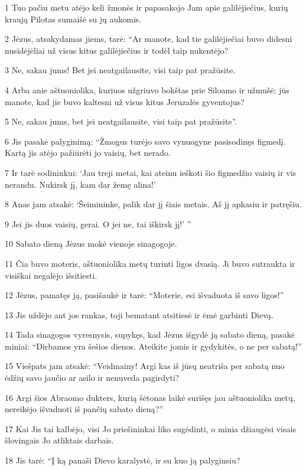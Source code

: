 \par 1 Tuo pačiu metu atėjo keli žmonės ir papasakojo Jam apie galilėjiečius, kurių kraują Pilotas sumaišė su jų aukomis. 
\par 2 Jėzus, atsakydamas jiems, tarė: “Ar manote, kad tie galilėjiečiai buvo didesni nusidėjėliai už visus kitus galilėjiečius ir todėl taip nukentėjo? 
\par 3 Ne, sakau jums! Bet jei neatgailausite, visi taip pat pražūsite. 
\par 4 Arba anie aštuoniolika, kuriuos užgriuvo bokštas prie Siloamo ir užmušė; jūs manote, kad jie buvo kaltesni už visus kitus Jeruzalės gyventojus? 
\par 5 Ne, sakau jums, bet jei neatgailausite, visi taip pat pražūsite”. 
\par 6 Jis pasakė palyginimą: “Žmogus turėjo savo vynuogyne pasisodinęs figmedį. Kartą jis atėjo pažiūrėti jo vaisių, bet nerado. 
\par 7 Ir tarė sodininkui: ‘Jau treji metai, kai ateinu ieškoti šio figmedžio vaisių ir vis nerandu. Nukirsk jį, kam dar žemę alina!’ 
\par 8 Anas jam atsakė: ‘Šeimininke, palik dar jį šiais metais. Aš jį apkasiu ir patręšiu. 
\par 9 Jei jis duos vaisių, gerai. O jei ne, tai iškirsk jį!’ ” 
\par 10 Sabato dieną Jėzus mokė vienoje sinagogoje. 
\par 11 Čia buvo moteris, aštuoniolika metų turinti ligos dvasią. Ji buvo sutraukta ir visiškai negalėjo išsitiesti. 
\par 12 Jėzus, pamatęs ją, pasišaukė ir tarė: “Moterie, esi išvaduota iš savo ligos!” 
\par 13 Jis uždėjo ant jos rankas, toji bematant atsitiesė ir ėmė garbinti Dievą. 
\par 14 Tada sinagogos vyresnysis, supykęs, kad Jėzus išgydė ją sabato dieną, pasakė miniai: “Dirbamos yra šešios dienos. Ateikite jomis ir gydykitės, o ne per sabatą!” 
\par 15 Viešpats jam atsakė: “Veidmainy! Argi kas iš jūsų neatriša per sabatą nuo ėdžių savo jaučio ar asilo ir nenuveda pagirdyti? 
\par 16 Argi šios Abraomo dukters, kurią šėtonas laikė surišęs jau aštuoniolika metų, nereikėjo išvaduoti iš pančių sabato dieną?” 
\par 17 Kai Jis tai kalbėjo, visi Jo priešininkai liko sugėdinti, o minia džiaugėsi visais šlovingais Jo atliktais darbais. 
\par 18 Jis tarė: “Į ką panaši Dievo karalystė, ir su kuo ją palyginsiu? 
